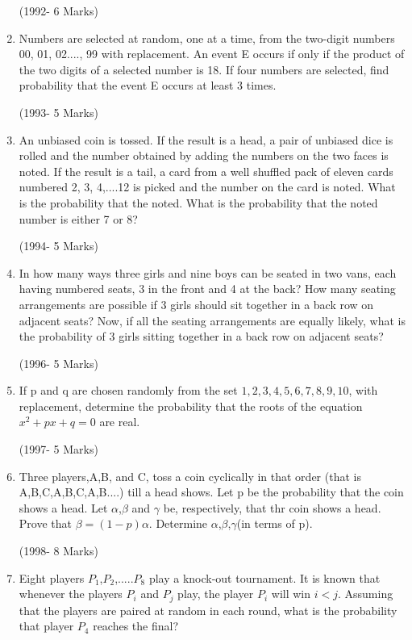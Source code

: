 \documentclass[journal,12pt,twocolumn]{IEEEtran}
\theoremstyle{remark}
\begin{document}
\begin{enumerate}
\hfill(1992- 6 Marks)

\item Numbers are selected at random, one at a time, from the two-digit numbers 00, 01, 02...., 99 with replacement. An event E occurs if only if the product of the two digits of a selected number is 18. If four numbers are selected, find probability that the event E occurs at least 3 times.

\hfill(1993- 5 Marks)

\item An unbiased coin is tossed. If the result is a head, a pair of unbiased dice is rolled and the number obtained by adding the numbers on the two faces is noted. If the result is a tail, a card from a well shuffled pack of eleven cards numbered 2, 3, 4,....12 is picked and the number on the card is noted. What is the probability that the noted. What is the probability that the noted number is either 7 or 8?

\hfill(1994- 5 Marks)

\item In how many ways three girls and nine boys can be seated in two vans, each having numbered seats, $3$ in the front and 4 at the back? How many seating arrangements are possible if 3 girls should sit together in a back row on adjacent seats? Now, if all the seating arrangements are equally likely, what is the probability of 3 girls sitting together in a back row on adjacent seats?

\hfill(1996- 5 Marks)

\item If p and q are chosen randomly from the set ${1,2,3,4,5,6,7,8,9,10}$, with replacement, determine the probability that the roots of the equation $x^2+px+q=0$ are real.
                                                      
\hfill(1997- 5 Marks)

\item Three players,A,B, and C, toss a coin cyclically in that order (that is A,B,C,A,B,C,A,B....) till a head shows. Let p be the probability that the coin shows a head. Let $\alpha$,$\beta$ and $\gamma$ be, respectively, that thr coin shows a head. Prove that $\beta=(1-p)\alpha$. Determine $\alpha$,$\beta$,$\gamma$(in terms of p).

\hfill(1998- 8 Marks)

\item Eight players $P_{1}$,$P_{2}$,.....$P_{8}$ play a knock-out tournament. It is known that whenever the players $P_{i}$ and $P_{j}$ play, the player $P_{i}$ will win $i<j$. Assuming that the players are paired at random in each round, what is the probability that player $P_{4}$ reaches the final?


\end{enumerate}
\end{document}
